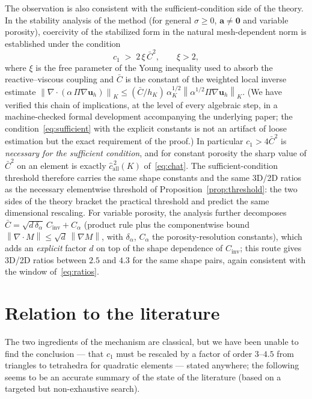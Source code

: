\documentclass[11pt,a4paper]{article}
\theoremstyle{remark}
\newcommand{\norm}[1]{\left\lVert #1 \right\rVert}
\newcommand{\nK}[1]{\left\lVert #1 \right\rVert_{K}}
\newcommand{\Proj}{\Pi}
\newcommand{\chat}{\hat{c}}
\begin{document}
The observation is also consistent with the sufficient-condition side
of the theory. In the stability analysis of the method (for general
$\sigma \ge 0$, $\boldsymbol a \neq \boldsymbol 0$ and variable
porosity), coercivity of the stabilized form in the natural mesh-de\-pendent
norm is established under the condition
%
\begin{equation}
\label{eq:sufficient}
c_1 \;>\; 2\,\xi\,\bar C^2, \qquad \xi > 2,
\end{equation}
%
where $\xi$ is the free parameter of the Young inequality used to
absorb the reactive--viscous coupling and $\bar C$ is the constant of
the weighted local inverse estimate
$\nK{\nabla\!\cdot(\alpha\,\Proj\nabla\boldsymbol u_h)} \le (\bar
C/h_K)\,\alpha_K^{1/2} \nK{\alpha^{1/2}\Proj\nabla\boldsymbol u_h}$.
(We have verified this chain of implications, at the level of every
algebraic step, in a machine-checked formal development accompanying
the underlying paper; the condition~\eqref{eq:sufficient} with the
explicit constants is not an artifact of loose estimation but the
exact requirement of the proof.) In particular
$c_1 > 4\bar C^2$ is \emph{necessary for the sufficient condition},
and for constant porosity the sharp value of $\bar C^2$ on an element
is exactly $\chat^{\,2}_{\mathrm{all}}(K)$ of~\eqref{eq:chat}. The
sufficient-condition threshold therefore carries the same shape
constants and the same 3D/2D ratios as the necessary elementwise
threshold of Proposition~\ref{prop:threshold}: the two sides of the
theory bracket the practical threshold and predict the same
dimensional rescaling. For variable porosity, the analysis further
decomposes $\bar C = \sqrt{d\,\delta_\alpha}\,C_{\mathrm{inv}} +
C_\alpha$ (product rule plus the componentwise bound
$\norm{\nabla\!\cdot M} \le \sqrt d\,\norm{\nabla M}$, with
$\delta_\alpha$, $C_\alpha$ the porosity-resolution constants), which
adds an \emph{explicit} factor $d$ on top of the shape dependence of
$C_{\mathrm{inv}}$; this route gives 3D/2D ratios between $2.5$ and
$4.3$ for the same shape pairs, again consistent with the window
of~\eqref{eq:ratios}.

\section{Relation to the literature}
\label{sec:literature}

The two ingredients of the mechanism are classical, but we have been
unable to find the conclusion --- that $c_1$ must be rescaled by a
factor of order $3$--$4.5$ from triangles to tetrahedra for quadratic
elements --- stated anywhere; the following seems to be an accurate
summary of the state of the literature (based on a targeted but
non-exhaustive search).
\end{document}
